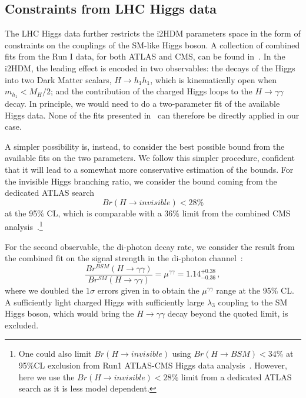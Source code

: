 \subsection{Constraints from LHC Higgs data}

The LHC Higgs data further restricts the i2HDM parameters space in the form of constraints on the couplings of the SM-like Higgs boson. A collection of combined fits from the Run I data, for both ATLAS and CMS, can be found in~\cite{Khachatryan:2016vau}.
In the i2HDM, the leading effect is encoded in two observables: the decays of the Higgs into two Dark Matter scalars, $H \to h_1 h_1$, which is kinematically open when $m_{h_1} < M_H/2$; and the contribution of the charged Higgs loops to the $H \to \gamma \gamma$ decay. 
In principle, we would need to do a two-parameter fit of the available Higgs data.  None of the fits presented in~\cite{Khachatryan:2016vau} can therefore be directly applied in our case.

A simpler possibility is, instead, to consider the best possible bound from the available fits on the two parameters.
We follow this simpler procedure, confident that it will lead to a somewhat more conservative estimation of the bounds.
For the invisible Higgs branching ratio, we consider the bound coming from the dedicated ATLAS search~\cite{Aad:2015txa}
\begin{equation}
Br(H\to invisible)  < 28\% 
\label{eq:lhc-higgs-invis}
\end{equation}
at the 95$\%$ CL, which is comparable with a 36\% limit
from the combined CMS analysis~\cite{CMS:2015naa}.\footnote{One could also limit $Br(H\to invisible)$ 
using $Br(H\to BSM)<34\% $ at 95$\%$CL exclusion from Run1  ATLAS-CMS Higgs data analysis~\cite{Khachatryan:2016vau}.
However, here we use the $Br(H\to invisible) < 28\% $ limit from a dedicated ATLAS search
as it is less model dependent.}

For the second observable, the di-photon decay rate, we consider the result from the combined fit on the signal strength in the di-photon channel~\cite{Khachatryan:2016vau}:
\begin{equation}
\frac{Br^{BSM}(H\to \gamma\gamma)}{Br^{SM}(H\to \gamma\gamma)} =\mu^{\gamma\gamma} = 1.14^{+0.38}_{-0.36}\,,
\label{eq:lhc-higgs-aa}
\end{equation}
where we doubled the $1\sigma$ errors given in \cite{Khachatryan:2016vau} to obtain the $\mu^{\gamma\gamma}$ range at the 95\% CL.
A sufficiently light charged Higgs with sufficiently large $\lambda_3$ coupling to the SM Higgs boson,
which would bring the $H\to \gamma\gamma$ decay beyond the quoted limit, is excluded.


